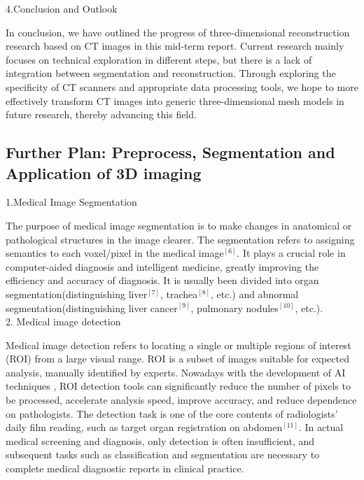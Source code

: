 \documentclass[12pt,a4paper]{report}
\begin{document}
4.Conclusion and Outlook

\qquad In conclusion, we have outlined the progress of three-dimensional reconstruction research based on CT images in this mid-term report. Current research mainly focuses on technical exploration in different
steps, but there is a lack of integration between segmentation and reconstruction. Through exploring the specificity of CT scanners and appropriate data processing tools, we hope to more effectively
transform CT images into generic three-dimensional mesh models in future research, thereby advancing this field.\\


\subsection{Further Plan: Preprocess, Segmentation and Application of 3D imaging}

1.Medical Image Segmentation

\qquad The purpose of medical image segmentation is to make changes in anatomical or pathological structures in the image clearer. The segmentation refers to assigning semantics to each voxel/pixel in the medical image$^{[6]}$.
It plays a crucial role in computer-aided diagnosis and intelligent medicine, greatly improving the efficiency and accuracy of diagnosis. It is usually been divided into organ segmentation(distinguishing liver$^{[7]}$, trachea$^{[8]}$,
etc.) and abnormal segmentation(distinguishing liver cancer$^{[9]}$, pulmonary nodules$^{[10]}$,  etc.).\\

2. Medical image detection

\qquad Medical image detection refers to locating a single or multiple regions of interest (ROI) from a large visual range. ROI is a subset of images suitable for expected analysis, manually identified by experts. Nowadays
with the development of AI techniques , ROI detection tools can significantly reduce the number of pixels to be processed, accelerate analysis speed, improve accuracy, and reduce dependence on pathologists.
The detection task is one of the core contents of radiologists' daily film reading, such as target organ registration on abdomen$^{[11]}$. In actual medical screening and diagnosis, only detection is often insufficient, and subsequent
tasks such as classification and segmentation are necessary to complete medical diagnostic reports in clinical practice.\\
\end{document}
